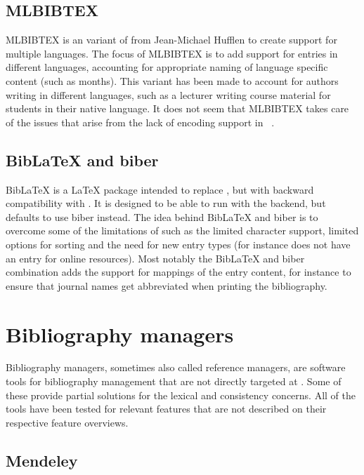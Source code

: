\subsection{MLBIBTEX}
MLBIBTEX is an variant of {\bibtex} from Jean-Michael Hufflen to
create support for multiple languages.  The focus of MLBIBTEX is to
add support for entries in different languages, accounting for
appropriate naming of language specific content (such as months).
This variant has been made to account for authors writing in different
languages, such as a lecturer writing course material for students in
their native language.  It does not seem that MLBIBTEX takes care of
the issues that arise from the lack of encoding support in
{\bibtex}~\cite{hufflen2001_mlbibtex}.


\subsection{Bib{\LaTeX} and biber}
\label{sec:related_biblatex}

Bib{\LaTeX} is a {\LaTeX} package intended to replace {\bibtex}, but
with backward compatibility with {\bibtex}.  It is designed to be able
to run with the {\bibtex} backend, but defaults to use biber instead.
The idea behind Bib{\LaTeX} and biber is to overcome some of the
limitations of {\bibtex} such as the limited character support,
limited options for sorting and the need for new entry types (for
instance {\bibtex} does not have an entry for online resources).  Most
notably the Bib{\LaTeX} and biber combination adds the support for
mappings of the entry content, for instance to ensure that journal
names get abbreviated when printing the bibliography.


\section{Bibliography managers}
\label{sec:bibliography_managers}

Bibliography managers, sometimes also called reference managers, are
software tools for bibliography management that are not directly
targeted at {\bibtex}.  Some of these provide partial solutions for
the lexical and consistency concerns.  All of the tools have been
tested for relevant features that are not described on their
respective feature overviews.

\subsection{Mendeley}
\label{sec:related_mendeley}

